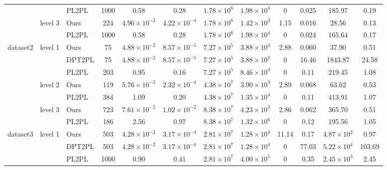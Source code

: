 \documentclass{vgtc}                          %
\begin{document}
\begin{table*}[tb]
\begin{tabular}{ c | c l c  c c | c c | c c c c}
		&  &PL2PL\cite{geneva2018lips} &  1000 & 0.58 &  0.28 & $1.78 \times 10^6$ & $1.98 \times 10^4$ & 0 & 0.025 & 185.97 & 0.19\\ \cline{2-12}
		& \multirow{2}{*}{level 3} 
		& Ours &   224 & $4.96 \times 10^{-2}$ & $ 4.22 \times 10^{-4}$ & $1.78 \times 10^6$ & $1.42 \times 10^3$ & 1.15 & 0.016 & 28.56 & 0.13\\
		&  &PL2PL\cite{geneva2018lips} & 1000   & 0.58 & 0.28  & $1.78 \times 10^6$ & $1.98 \times 10^4$ & 0 & 0.024 & 165.64 & 0.17\\
		\hline
		\multirow{7}{*}{dataset2}
		& \multirow{3}{*}{level 1} 
		& Ours & 75 & $4.88 \times 10^{-2}$ & $8.57 \times 10^{-5}$ & $7.27 \times 10^5$ & $3.88 \times 10^3$ & 2.88 & 0.060 & 37.90 & 0.51\\
		& & DPT2PL & 75 & $4.88 \times 10^{-2}$ & $8.57 \times 10^{-5}$ & $7.27 \times 10^5$ & $3.88 \times 10^3$ & 0 & 16.46 & 1843.87 & 24.58\\
		&  &PL2PL\cite{geneva2018lips} &  203 & 0.95 & 0.16 & $7.27 \times 10^5$ & $8.46 \times 10^3$ & 0 & 0.11 & 219.45 & 1.08\\
		\cline{2-12}
		& \multirow{2}{*}{level 2} 
		& Ours &  119 & $5.76 \times 10^{-2}$ & $2.32 \times 10^{-4}$  & $4.38 \times  10^7$ &  $3.90 \times 10^3$ & 2.89 & 0.068 & 63.62 & 0.53  \\
		&  &PL2PL\cite{geneva2018lips} &  384 & 1.09  &  0.20&  $4.38 \times 10^7$ & $1.35 \times 10^4$ & 0 & 0.11 & 413.91 & 1.07\\
		\cline{2-12}
		& \multirow{2}{*}{level 3} 
		& Ours &  723 &  $7.61 \times 10^{-2}$ & $1.02 \times 10^{-2}$ & $8.38 \times 10^7$ &  $4.23 \times 10^3$ & 2.86 & 0.062 & 365.70 & 0.51\\
		&  &PL2PL\cite{geneva2018lips} &   186 & 2.56  & 0.97 & $8.38 \times 10^7$ & $1.32 \times 10^6$& 0 & 0.12 &  195.56 & 1.05\\
		\hline
		\multirow{7}{*}{dataset3}  
		& \multirow{3}{*}{level 1} 
		& Ours &   503 & $4.28 \times 10^{-2}$& $3.17 \times 10^{-4}$ & $2.81 \times 10^7$ & $1.28 \times10^4$ &  11.14  & 0.17 & $4.87 \times 10^2$  &  0.97 \\
		&  &DPT2PL &  503 & $4.28 \times 10^{-2}$& $3.17 \times 10^{-4}$ & $2.81 \times 10^7$ & $1.28 \times10^4$ &  0 & 77.03 & $5.22 \times 10^4$  & 103.69  \\
		&  &PL2PL\cite{geneva2018lips} &  1000 & 0.90& 0.41 & $2.81 \times 10^7$  & $4.00 \times 10^5$ & 0 & 0.35& $2.45\times 10^3$ & 2.45\\ \cline{2-12}

\end{tabular}
\end{table*}
\end{document}
